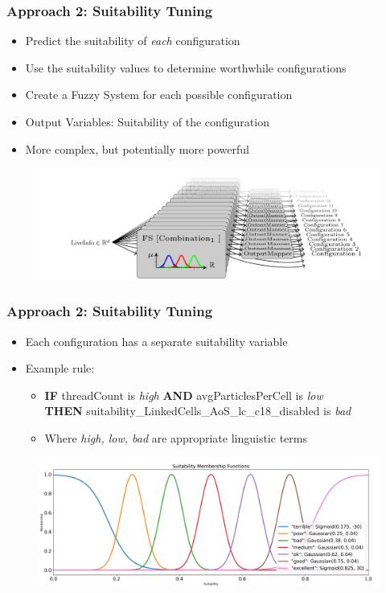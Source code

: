 \documentclass[
	10pt,
	t		%
]{beamer}
\begin{document}
\begin{frame}
	\frametitle{Approach 2: Suitability Tuning}
	\begin{itemize}
		\item Predict the suitability of \textit{each} configuration
		\item Use the suitability values to determine worthwhile configurations
		\item Create a Fuzzy System for each possible configuration
		\item Output Variables: Suitability of the configuration
		\item More complex, but potentially more powerful
	\end{itemize}

	\begin{figure}
		\centering
		\includegraphics[width=1\textwidth]{figures/suitability-approach.png}
	\end{figure}
\end{frame}


\begin{frame}
	\frametitle{Approach 2: Suitability Tuning}
	\begin{itemize}
		\item Each configuration has a separate suitability variable
		\item Example rule:
		      \begin{itemize}
			      \item
			            \textbf{IF} threadCount is \textit{high} \textbf{AND} avgParticlesPerCell is \textit{low}\\ \qquad \textbf{THEN} suitability\_LinkedCells\_AoS\_lc\_c18\_disabled is \textit{bad}
			      \item Where \textit{high, low, bad} are appropriate linguistic terms
		      \end{itemize}
	\end{itemize}

	\begin{figure}
		\centering
		\includegraphics[width=1\textwidth]{figures/suitability-linguistic-variable.png}
	\end{figure}

\end{frame}
\end{document}
